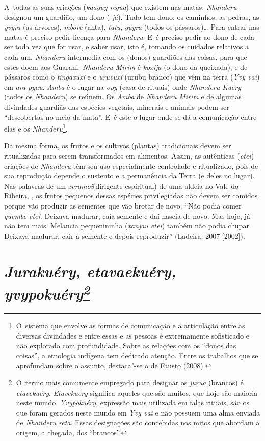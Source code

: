 A~todas as suas criações (\emph{kaaguy regua}) que existem nas matas, \emph{Nhanderu}
designou um guardião, um dono (-\emph{já}). Tudo tem dono: os caminhos, as
pedras, as \emph{yvyra} (as árvores), \emph{mbore} (anta), \emph{tatu}, \emph{guyra} (todos os
pássaros)\ldots{} Para entrar nas matas é preciso pedir licença para
\emph{Nhanderu}. E~é preciso pedir ao dono de cada ser toda vez que for usar,
e saber usar, isto é, tomando os cuidados relativos a cada um. \emph{Nhanderu}
intermedia com os (donos) guardiões das coisas, para que estes doem aos
Guarani. \emph{Nhanderu Mirim} é \emph{koxija} (o dono da queixada), e de pássaros
como o \emph{tingaxuxĩ} e o
\emph{uruvuxĩ} (urubu branco) que vêm na terra (\emph{Yvy vai})
em \emph{ara pyau}. \emph{Amba} é o lugar na \emph{opy} (casa de rituais) onde \emph{Nhanderu
Kuéry} (todos os \emph{Nhanderu}) se reúnem. Os \emph{Amba} de \emph{Nhanderu Mirim} e de
algumas divindades guardiãs das espécies vegetais, minerais e animais
podem ser ``descobertas no meio da mata''. E~é este o lugar onde se dá a
comunicação entre elas e os \emph{Nhanderu}\footnote{O~sistema que envolve as
formas de comunicação e a articulação entre as diversas divindades e
entre essas e as pessoas é extremamente sofisticado e não explorado com
profundidade. Sobre as relações com os ``donos das coisas'', a etnologia
indígena tem dedicado atenção. Entre os trabalhos que se aprofundam
sobre o assunto, destaca"-se o de Fausto (2008). }. 

Da mesma forma, os frutos e os cultivos (plantas) tradicionais devem ser
ritualizadas para serem transformados em alimentos. Assim, as
autênticas (\emph{etei}) criações de \emph{Nhanderu} têm seu uso especialmente
controlado e ritualizado, pois de sua reprodução depende o sustento e a
permanência da Terra (e deles no lugar). Nas palavras de um
\emph{xeramoĩ}(dirigente espiritual) de uma aldeia no
Vale do Ribeira, , os frutos pequenos dessas espécies privilegiadas
não devem ser comidos porque vão produzir as sementes que vão brotar de
novo. ``Não podia comer \emph{guembe etei}. Deixava madurar, caía semente e daí
nascia de novo. Mas hoje, já não tem mais. Melancia pequenininha
(\emph{xanjau etei}) também não podia chupar. Deixava madurar, cair a semente
e depois reproduzir'' (Ladeira, 2007 [2002]).

\section{\emph{Jurakuéry, etavaekuéry, yvypokuéry\protect\footnote{O~termo mais comumente
empregado para designar os \emph{jurua} (brancos) é \emph{etavekuéry}. \emph{Etavekuéry}
significa aqueles que são muitos, que hoje são maioria neste mundo.
\emph{Yvypokuéry}, expressão mais utilizada em falas rituais, são os que foram
gerados neste mundo em \emph{Yvy vai} e não possuem uma alma enviada de
\emph{Nhanderu retã}. Essas designações são concebidas nos mitos que abordam a
origem, a chegada, dos ``brancos''.}}}


